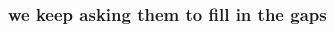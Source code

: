 \documentclass[presentation]{subfiles}
\begin{document}
\begin{frame}\frametitle{we keep asking them to fill in the gaps}
\begin{columns}
\begin{column}{0.5\textwidth}
  
  
  

\end{column}
\end{columns}
\end{frame}
\end{document}
